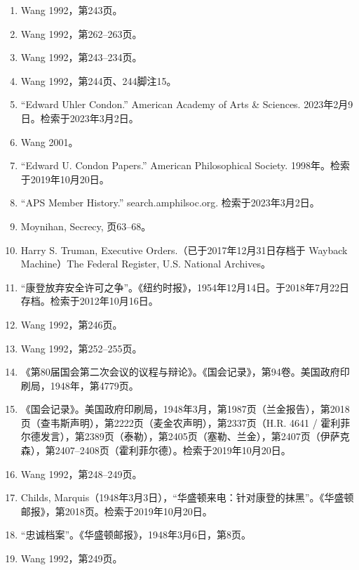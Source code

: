 \begin{enumerate}
\item Wang 1992，第243页。
\item Wang 1992，第262–263页。
\item Wang 1992，第243–234页。
\item Wang 1992，第244页、244脚注15。
\item “Edward Uhler Condon.” American Academy of Arts & Sciences. 2023年2月9日。检索于2023年3月2日。
\item Wang 2001。
\item “Edward U. Condon Papers.” American Philosophical Society. 1998年。检索于2019年10月20日。
\item “APS Member History.” search.amphilsoc.org. 检索于2023年3月2日。
\item Moynihan, Secrecy, 页63–68。
\item Harry S. Truman, Executive Orders.（已于2017年12月31日存档于 Wayback Machine）The Federal Register, U.S. National Archives。
\item “康登放弃安全许可之争”。《纽约时报》，1954年12月14日。于2018年7月22日存档。检索于2012年10月16日。
\item Wang 1992，第246页。
\item Wang 1992，第252–255页。
\item 《第80届国会第二次会议的议程与辩论》。《国会记录》，第94卷。美国政府印刷局，1948年，第4779页。
\item 《国会记录》。美国政府印刷局，1948年3月，第1987页（兰金报告），第2018页（查韦斯声明），第2222页（麦金农声明），第2337页（H.R. 4641 / 霍利菲尔德发言），第2389页（泰勒），第2405页（塞勒、兰金），第2407页（伊萨克森），第2407–2408页（霍利菲尔德）。检索于2019年10月20日。
\item Wang 1992，第248–249页。
\item Childs, Marquis（1948年3月3日），“华盛顿来电：针对康登的抹黑”。《华盛顿邮报》，第2018页。检索于2019年10月20日。
\item “忠诚档案”。《华盛顿邮报》，1948年3月6日，第8页。
\item Wang 1992，第249页。



\end{enumerate}
